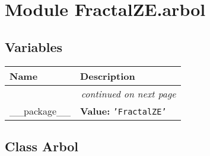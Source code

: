 %
%
%


\section{Module FractalZE.arbol}

    \label{FractalZE:arbol}


  \subsection{Variables}

    \vspace{-1cm}
\hspace{\varindent}\begin{longtable}{|p{\varnamewidth}|p{\vardescrwidth}|l}
\cline{1-2}
\cline{1-2} \centering \textbf{Name} & \centering \textbf{Description}& \\
\cline{1-2}
\endhead\cline{1-2}\multicolumn{3}{r}{\small\textit{continued on next page}}\\\endfoot\cline{1-2}
\endlastfoot\raggedright \_\-\_\-p\-a\-c\-k\-a\-g\-e\-\_\-\_\- & \raggedright \textbf{Value:} 
{\tt \texttt{'}\texttt{FractalZE}\texttt{'}}&\\
\cline{1-2}
\end{longtable}



\subsection{Class Arbol}

